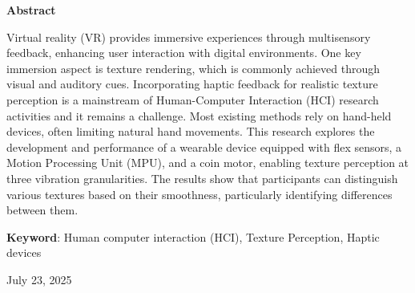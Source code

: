 \documentclass[uplatex,
12pt, %
a4paper,
english, %
oneside,
titlepage,
singlespacing, %
liststotoc, %
headsepline,
]{MastersDoctoralThesis} %
\begin{document}
\begin{center}
    \textbf{Abstract} %
\end{center}
\vspace{0.5cm} %

Virtual reality (VR) provides immersive experiences through multisensory feedback, enhancing user interaction with digital environments. One key immersion aspect is texture rendering, which is commonly achieved through visual and auditory cues. Incorporating haptic feedback for realistic texture perception is a mainstream of Human-Computer Interaction (HCI) research activities and it remains a challenge. Most existing methods rely on hand-held devices, often limiting natural hand movements. This research explores the development and performance of a wearable device equipped with flex sensors, a Motion Processing Unit (MPU), and a coin motor, enabling texture perception at three vibration granularities. The results show that participants can distinguish various textures based on their smoothness, particularly identifying differences between them.

\vspace{5mm} %

\textbf{Keyword}: Human computer interaction (HCI), Texture Perception, Haptic devices

\vspace{2cm} %
\begin{center}
      {July 23, 2025} %
\end{center}

\end{document}
